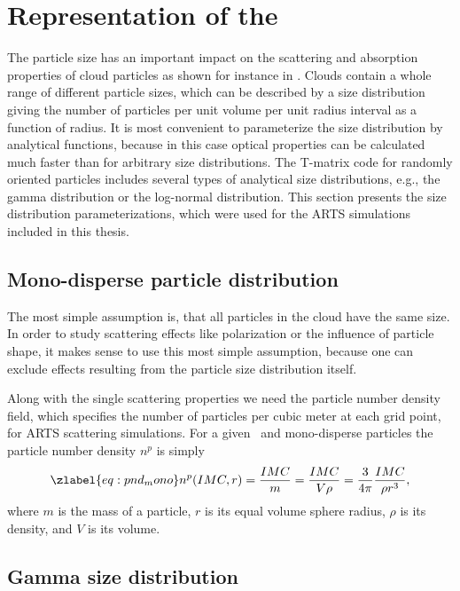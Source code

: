 \section[Particle size distributions]{Representation of the }

The particle size has an important impact on the scattering and
absorption properties of cloud particles as shown for instance in 
\citep{emde04:_doit_jgr}.  Clouds contain a whole range of
different particle sizes, which can be described by a size
distribution giving the number of particles per unit volume per unit
radius interval as a function of radius.  It is most convenient to
parameterize the size distribution by analytical functions, because in
this case optical properties can be calculated much faster than for
arbitrary size distributions. The T-matrix code for randomly oriented
particles includes several types of analytical size distributions,
e.g., the gamma distribution or the log-normal distribution.  This
section presents the size distribution parameterizations, which were
used for the ARTS simulations included in this thesis.

\subsection{Mono-disperse particle distribution}

The most simple assumption is, that all particles in the cloud have
the same size.  In order to study scattering effects like polarization
or the influence of particle shape, it makes sense to use this most
simple assumption, because one can exclude effects resulting from the
particle size distribution itself.  

Along with the single scattering properties we need the particle
number density field, which specifies the number of particles per
cubic meter at each grid point, for ARTS scattering simulations.  For
a given \imc\ and mono-disperse particles the particle number density
$n^p$ is simply
\begin{equation}
\zlabel{eq:pnd_mono}
  n^p (\imc, r) =\frac{\imc}{m} = \frac{\imc}{V\rho}
    =\frac{3}{4\pi}\frac{\imc}{\rho r^3},  
\end{equation}
where $m$ is the mass of a particle, $r$ is its equal volume sphere
radius, $\rho$ is its density, and $V$ is its volume.
     
\subsection{Gamma size distribution}

